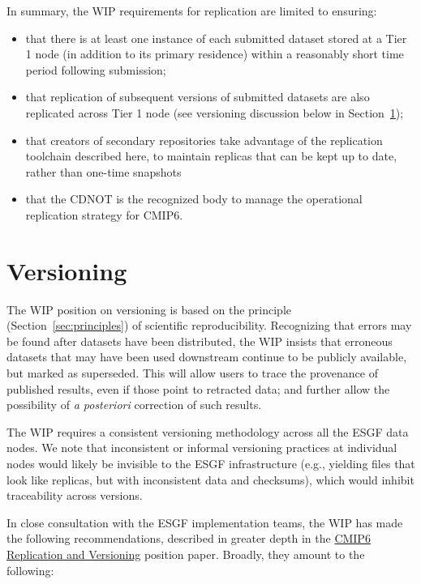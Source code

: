 \documentclass[gmd,manuscript]{copernicus}
\newcommand{\secref}[1] {\mbox{Section  \ref{sec:#1}}}
\begin{document}
In summary, the WIP requirements for replication are limited to
ensuring:

\begin{itemize}
\item that there is at least one instance of each submitted dataset
  stored at a Tier 1 node (in addition to its primary residence)
  within a reasonably short time period following submission;
\item that replication of subsequent versions of submitted datasets
  are also replicated across Tier 1 node (see versioning discussion
  below in \secref{version});
\item that creators of secondary repositories take advantage of the
  replication toolchain described here, to maintain replicas that can
  be kept up to date, rather than one-time snapshots
\item that the CDNOT is the recognized body to manage the operational
  replication strategy for CMIP6.
\end{itemize}

\section{Versioning}
\label{sec:version}

The WIP position on versioning is based on the principle
(\secref{principles}) of scientific reproducibility. Recognizing that
errors may be found after datasets have been distributed, the WIP
insists that erroneous datasets that may have been used downstream continue
to be publicly available, but marked as superseded. This will allow
users to trace the provenance of published results, even if those
point to retracted data; and further allow the possibility of 
\emph{a posteriori} correction of such results.

The WIP requires a consistent versioning methodology across all the
ESGF data nodes. We note that inconsistent or informal versioning
practices at individual nodes would likely be invisible to the ESGF
infrastructure (e.g., yielding files that look like replicas, but with 
inconsistent data and checksums), which would inhibit traceability 
across versions.

In close consultation with the ESGF implementation teams, the WIP has
made the following recommendations, described in greater depth in the
\href{https://goo.gl/jqWjQ5}{CMIP6 Replication and Versioning}
position paper. Broadly, they amount to the following:
\end{document}
